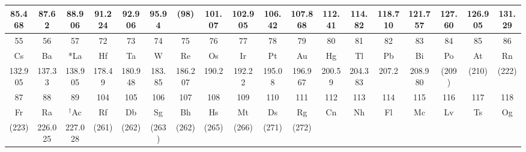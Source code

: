 \begin{tcolorbox}[
        colback=colorrds!5!white,
        colframe=colorrds!35!white,
        coltitle=black,
        fonttitle=\bfseries,
        center title,
        title=Tabla Periódica de los Elementos]
\begin{center}
\begin{tabular}{|c*{16}{|c}|c|}
            \small 85.468  & \small 87.62   & \small 88.906  & \small 91.224 & \small 92.906  & \small 95.94  & \small (98)    & \small 101.07 & \small 102.905 & \small 106.42 & \small 107.868 & \small 112.41 & \small 114.82  & \small 118.710 & \small 121.757 & \small 127.60 & \small 126.905 & \small 131.29                     \\[-1mm]
            \hline
            \small 55      & \small 56      & \small 57      & \small 72     & \small 73      & \small 74     & \small 75      & \small 76     & \small 77      & \small 78     & \small 79      & \small 80     & \small 81      & \small 82      & \small 83      & \small 84     & \small 85      & \small 86                         \\[-1mm]
            Cs             & Ba             & *La            & Hf            & Ta             & W             & Re             & Os            & Ir             & Pt            & Au             & Hg            & Tl             & Pb             & Bi             & Po            & At             & Rn                                \\[-2mm]
            \small 132.905 & \small 137.33  & \small 138.905 & \small 178.49 & \small 180.948 & \small 183.85 & \small 186.207 & \small 190.2  & \small 192.22  & \small 195.08 & \small 196.967 & \small 200.59 & \small 204.383 & \small 207.2   & \small 208.980 & \small (209)  & \small (210)   & \small (222)                      \\
            \hline
            \small 87      & \small 88      & \small 89      & \small 104    & \small 105     & \small 106    & \small 107     & \small 108    & \small 109     & \small 110    & \small 111     & \small 112    & \small 113     & \small 114     & \small 115     & \small 116    & \small 117     & \small 118 \tabularnewline [-1mm]
            Fr             & Ra             & $^\dagger$Ac   & Rf            & Db             & Sg            & Bh             & Hs            & Mt             & Ds            & Rg             & Cn            & Nh             & Fl             & Mc             & Lv            & Ts             & Og\tabularnewline [-2mm]
            \small (223)   & \small 226.025 & \small 227.028 & \small (261)  & \small (262)   & \small (263)  & \small (262)   & \small (265)  & \small (266)   & \small (271)  & \small (272)   &               &                &                &                &               &                &                                   \\

\end{tabular}
\end{center}
\end{tcolorbox}
